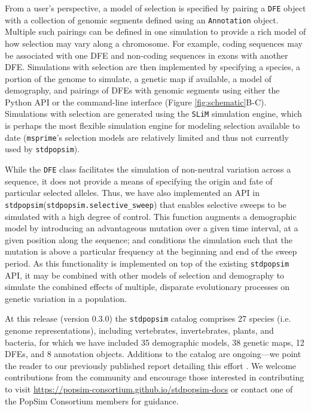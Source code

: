 \documentclass[hidelinks]{article}
\newcommand{\stdpopsim}{\texttt{stdpopsim}\xspace}
\newcommand{\slim}{\texttt{SLiM}\xspace}
\newcommand{\msprime}{\texttt{msprime}\xspace}
\begin{document}
    From a user's perspective, a model of selection is specified by pairing a \texttt{DFE} object
    with a collection of genomic segments defined using an \texttt{Annotation} object.
    Multiple such pairings can be defined in one simulation
    to provide a rich model of how selection may vary along a chromosome.
    For example, coding sequences may be associated with one DFE and non-coding sequences in exons with another DFE.
    Simulations with selection are then implemented by specifying a species,
    a portion of the genome to simulate,
    a genetic map if available, a model of demography, and pairings of DFEs with genomic segments
    using either the Python API or the command-line interface (Figure \ref{fig:schematic}B-C).
    Simulations with selection are generated
    using the \slim simulation engine, which is perhaps
    the most flexible simulation engine for modeling selection available to date
    (\msprime's selection models are relatively limited and thus not currently used by \stdpopsim).

    While the \texttt{DFE} class facilitates the simulation of non-neutral variation across a sequence,
    it does not provide a means of specifying the origin and fate of particular selected alleles.
    Thus, we have also implemented an API in \stdpopsim (\texttt{stdpopsim.selective\_sweep}) that enables 
    selective sweeps to be simulated with a high degree of control.
    This function augments a demographic model by introducing an advantageous mutation over a given time interval,
    at a given position along the sequence; and conditions the simulation such that the mutation is above a particular 
    frequency at the beginning and end of the sweep period.
    As this functionality is implemented on top of the existing \stdpopsim API, it may be combined with other 
    models of selection and demography to simulate the combined effects of multiple, disparate evolutionary processes
    on genetic variation in a population.


    At this release (version 0.3.0) the \stdpopsim catalog comprises 27 species (i.e. genome representations),
    including vertebrates, invertebrates, plants, and bacteria,
    for which we have included 35 demographic models, 38 genetic maps, 12 DFEs, and 8 annotation objects. %
    Additions to the catalog are ongoing---we point the reader to our previously published
    report detailing this effort \citep{lauterbur2023expanding}. We welcome contributions from the
    community and encourage those interested in contributing to visit \url{https://popsim-consortium.github.io/stdpopsim-docs}
    or contact one of the PopSim Consortium members for guidance.
\end{document}
